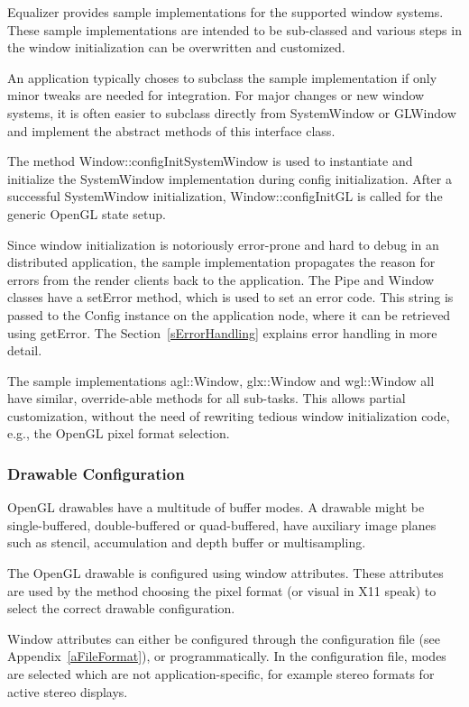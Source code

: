 \documentclass[10pt,a4]{scrartcl}
\newcommand{\sref}[1]{Section~\ref{#1}}
\newcommand{\aref}[1]{Appendix~\ref{#1}}
\begin{document}
Equalizer provides sample implementations for the supported window
systems. These sample implementations are intended to be sub-classed and
various steps in the window initialization can be overwritten and
customized.

An application typically choses to subclass the sample implementation if only
minor tweaks are needed for integration. For major changes or new window
systems, it is often easier to subclass directly from \textsf{SystemWindow} or
\textsf{GLWindow} and implement the abstract methods of this interface class.

The method \textsf{Window::configInitSystemWindow} is used to instantiate
and initialize the \textsf{SystemWindow} implementation during config
initialization. After a successful \textsf{SystemWindow} initialization,
\textsf{Window::configInitGL} is called for the generic OpenGL state
setup.

Since window initialization is notoriously error-prone and hard to debug in an
distributed application, the sample implementation propagates the reason for
errors from the render clients back to the application. The \textsf{Pipe} and
\textsf{Window} classes have a \textsf{setError} method, which is used to set an
error code. This string is passed to the \textsf{Config} instance on the
application node, where it can be retrieved using \textsf{getError}. The
\sref{sErrorHandling} explains error handling in more detail.

The sample implementations \textsf{agl::Window}, \textsf{glx::Window} and
\textsf{wgl::Window} all have similar, override-able methods for all
sub-tasks. This allows partial customization, without the need of
rewriting tedious window initialization code, e.g., the OpenGL pixel
format selection.

\subsubsection{\label{sDrawableConfig}Drawable Configuration}

OpenGL drawables have a multitude of buffer modes. A drawable might be
single-buffered, double-buffered or quad-buffered, have auxiliary image
planes such as stencil, accumulation and depth buffer or multisampling.

The OpenGL drawable is configured using window attributes. These
attributes are used by the method choosing the pixel format (or visual
in X11 speak) to select the correct drawable configuration.

Window attributes can either be configured through the configuration
file (see \aref{aFileFormat}), or programmatically. In the configuration
file, modes are selected which are not application-specific, for example
stereo formats for active stereo displays. 
\end{document}
